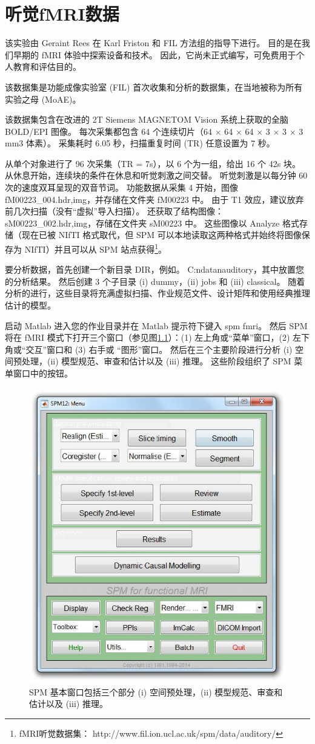\chapter{听觉fMRI数据}

该实验由 Geraint Rees 在 Karl Friston 和 FIL 方法组的指导下进行。 目的是在我们早期的 fMRI 体验中探索设备和技术。 因此，它尚未正式编写，可免费用于个人教育和评估目的。

该数据集是功能成像实验室 (FIL) 首次收集和分析的数据集，在当地被称为所有实验之母 (MoAE)。

该数据集包含在改进的 2T Siemens MAGNETOM Vision 系统上获取的全脑 BOLD/EPI 图像。 每次采集都包含 64 个连续切片（64 $\times$ 64 $\times$ 64 $\times$ 3 $\times$ 3 $\times$ 3 mm3 体素）。 采集耗时 6.05 秒，扫描重复时间 (TR) 任意设置为 7 秒。

从单个对象进行了 96 次采集（TR = 7s），以 6 个为一组，给出 16 个 42s 块。 从休息开始，连续块的条件在休息和听觉刺激之间交替。 听觉刺激是以每分钟 60 次的速度双耳呈现的双音节词。 功能数据从采集 4 开始，图像 fM00223\_004.{hdr,img}，并存储在文件夹 fM00223 中。 由于 T1 效应，建议放弃前几次扫描（没有“虚拟”导入扫描）。 还获取了结构图像：sM00223\_002.{hdr,img}，存储在文件夹 sM00223 中。 这些图像以 Analyze 格式存储（现在已被 NIfTI 格式取代，但 SPM 可以本地读取这两种格式并始终将图像保存为 NIfTI）并且可以从 SPM 站点获得\footnote{fMRI听觉数据集： http://www.fil.ion.ucl.ac.uk/spm/data/auditory/}。

要分析数据，首先创建一个新目录 DIR，例如。 C:ndatanauditory，其中放置您的分析结果。 然后创建 3 个子目录 (i) dummy，(ii) jobs 和 (iii) classical。 随着分析的进行，这些目录将充满虚拟扫描、作业规范文件、设计矩阵和使用经典推理估计的模型。

启动 Matlab 进入您的作业目录并在 Matlab 提示符下键入 spm fmri。 然后 SPM 将在 fMRI 模式下打开三个窗口（参见图\ref{fig_30_1}）：(1) 左上角或“菜单”窗口，(2) 左下角或“交互”窗口和 (3) 右手或 “图形”窗口。 然后在三个主要阶段进行分析 (i) 空间预处理，(ii) 模型规范、审查和估计以及 (iii) 推理。 这些阶段组织了 SPM 菜单窗口中的按钮。

\begin{figure}[htbp]
	\centering
	\includegraphics[width=0.6\linewidth]{part7/figs/fig_30_1}
	\caption{SPM 基本窗口包括三个部分 (i) 空间预处理，(ii) 模型规范、审查和估计以及 (iii) 推理。}
	\label{fig_30_1}
\end{figure}

